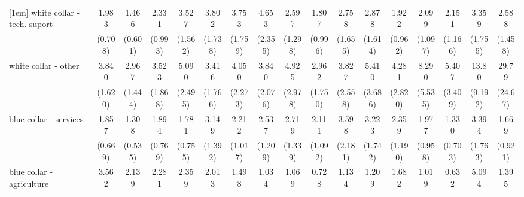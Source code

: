 {\begin{tabular}{l*{16}{c}}
[1em]
white collar - tech. suport&       1.983         &       1.466         &       2.331\sym{*}  &       3.527\sym{**} &       3.802\sym{**} &       3.753\sym{**} &       4.653\sym{**} &       2.597         &       1.807         &       2.758         &       2.878         &       1.922         &       2.099         &       2.151         &       3.359\sym{*}  &       2.588         \\
                    &     (0.708)         &     (0.601)         &     (0.993)         &     (1.562)         &     (1.738)         &     (1.759)         &     (2.355)         &     (1.298)         &     (0.996)         &     (1.655)         &     (1.614)         &     (0.962)         &     (1.097)         &     (1.166)         &     (1.755)         &     (1.458)         \\
[1em]
white collar - other&       3.840\sym{**} &       2.967\sym{*}  &       3.523\sym{*}  &       5.090\sym{***}&       3.416\sym{*}  &       4.050\sym{*}  &       3.840\sym{*}  &       4.925\sym{**} &       2.962         &       3.827\sym{*}  &       5.410\sym{*}  &       4.281\sym{*}  &       8.290\sym{**} &       5.407\sym{**} &       13.80\sym{***}&       29.79\sym{***}\\
                    &     (1.620)         &     (1.444)         &     (1.868)         &     (2.495)         &     (1.766)         &     (2.273)         &     (2.076)         &     (2.978)         &     (1.750)         &     (2.558)         &     (3.686)         &     (2.820)         &     (5.535)         &     (3.409)         &     (9.192)         &     (24.67)         \\
[1em]
blue collar - services&       1.857         &       1.308         &       1.894         &       1.781         &       3.149\sym{**} &       2.212         &       2.537         &       2.719\sym{*}  &       2.111         &       3.598\sym{*}  &       3.223\sym{*}  &       2.359         &       1.977         &       1.330         &       3.394\sym{*}  &       1.669         \\
                    &     (0.669)         &     (0.535)         &     (0.769)         &     (0.755)         &     (1.392)         &     (1.017)         &     (1.209)         &     (1.339)         &     (1.092)         &     (2.181)         &     (1.742)         &     (1.190)         &     (0.958)         &     (0.703)         &     (1.763)         &     (0.921)         \\
[1em]
blue collar - agriculture&       3.562\sym{*}  &       2.139         &       2.281         &       2.359         &       2.013         &       1.498         &       1.034         &       1.069         &       0.728         &       1.134         &       1.209         &       1.682         &       1.019         &       0.632         &       5.094\sym{*}  &       1.395         \\

\end{tabular}}
